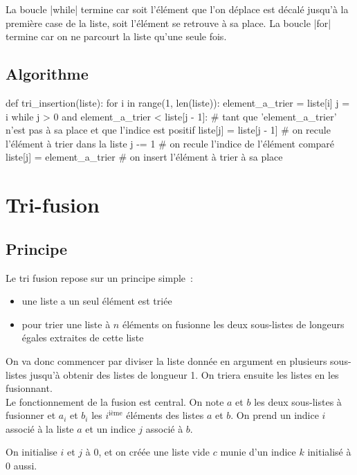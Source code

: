 		La boucle \python|while| termine car soit l'élément que l'on déplace est décalé jusqu'à la première case de la liste, soit l'élément se retrouve à sa place. La boucle \python|for| termine car on ne parcourt la liste qu'une seule fois.
	
	\subsection{Algorithme}

		\begin{pythoncode}
			def tri_insertion(liste):
				for i in range(1, len(liste)):
					element_a_trier = liste[i]
					j = i
					while j > 0 and element_a_trier < liste[j - 1]: # tant que 'element_a_trier' n'est pas à sa place et que l'indice est positif
						liste[j] = liste[j - 1] # on recule l'élément à trier dans la liste
						j -= 1 # on recule l'indice de l'élément comparé
					liste[j] = element_a_trier # on insert l'élément à trier à sa place
		\end{pythoncode}
		
\section{Tri-fusion}
	
	\subsection{Principe}
		
		Le tri fusion repose sur un principe simple~:
		\begin{itemize}
			\item une liste a un seul élément est triée
			\item pour trier une liste à $n$ éléments on fusionne les deux sous-listes de longeurs égales extraites de cette liste
		\end{itemize}
		
		On va donc commencer par diviser la liste donnée en argument en plusieurs sous-listes jusqu'à obtenir des listes de longueur 1. On triera ensuite les listes en les fusionnant. \\
		
		Le fonctionnement de la fusion est central. On note $a$ et $b$ les deux sous-listes à fusionner et $a_i$ et $b_i$ les $i^{\textrm{ième}}$ éléments des listes $a$ et $b$. On prend un indice $i$ associé à la liste $a$ et un indice $j$ associé à $b$. 
		
		On initialise $i$ et $j$ à $0$, et on créée une liste vide $c$ munie d'un indice $k$ initialisé à $0$ aussi.
		
